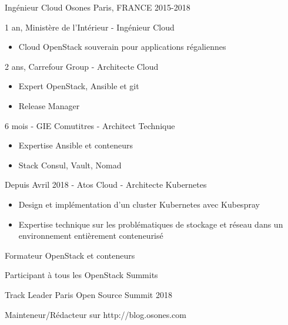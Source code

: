 \begin{cventries}
  \cventry
    {Ingénieur Cloud} %
    {Osones} %
    {Paris, FRANCE} %
    {2015-2018} %
    {
      \begin{cvitems} %
      \item {1 an, Ministère de l'Intérieur - Ingénieur Cloud}
          \begin{itemize}
            \item {Cloud OpenStack souverain pour applications régaliennes}
          \end{itemize}
        \item {2 ans, Carrefour Group - Architecte Cloud}
          \begin{itemize}
            \item {Expert OpenStack, Ansible et git}
            \item {Release Manager}
          \end{itemize}
        \item {6 mois - GIE Comutitres - Architect Technique}
          \begin{itemize}
            \item {Expertise Ansible et conteneurs}
            \item {Stack Consul, Vault, Nomad}
          \end{itemize}
        \item {Depuis Avril 2018 - Atos Cloud - Architecte Kubernetes}
        \begin{itemize}
          \item {Design et implémentation d'un cluster Kubernetes avec
            Kubespray}
          \item {Expertise technique sur les problématiques de stockage et
            réseau dans un environnement entièrement conteneurisé}
          \end{itemize}
        \item {Formateur OpenStack et conteneurs}
        \item {Participant à tous les OpenStack Summits}
        \item {Track Leader Paris Open Source Summit 2018}
        \item {Mainteneur/Rédacteur sur http://blog.osones.com}
      \end{cvitems}
    }


\end{cventries}

